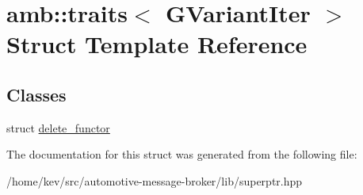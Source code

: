 \hypertarget{structamb_1_1traits_3_01GVariantIter_01_4}{\section{amb\+:\+:traits$<$ G\+Variant\+Iter $>$ Struct Template Reference}
\label{structamb_1_1traits_3_01GVariantIter_01_4}
}
\subsection*{Classes}
\begin{DoxyCompactItemize}
\item 
struct \hyperlink{structamb_1_1traits_3_01GVariantIter_01_4_1_1delete__functor}{delete\+\_\+functor}
\end{DoxyCompactItemize}


The documentation for this struct was generated from the following file\+:\begin{DoxyCompactItemize}
\item 
/home/kev/src/automotive-\/message-\/broker/lib/superptr.\+hpp\end{DoxyCompactItemize}
